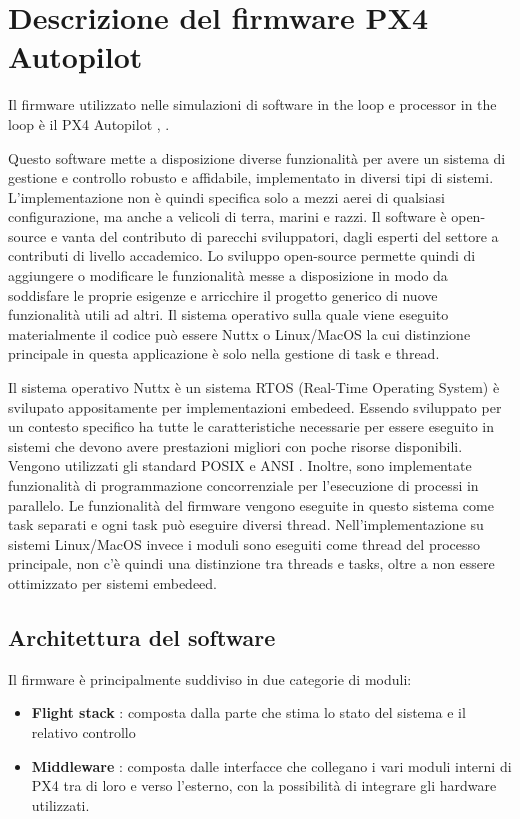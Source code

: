 \section{Descrizione del firmware PX4 Autopilot}
Il firmware utilizzato nelle simulazioni di software in the loop e processor in the loop è il PX4 Autopilot \cite{px4Firmware}, \cite{px4Guide}.
	
Questo software mette a disposizione diverse funzionalità per avere un sistema di gestione e controllo robusto e affidabile, implementato in diversi tipi di sistemi. L'implementazione non è quindi specifica solo a mezzi aerei di qualsiasi configurazione, ma anche a velicoli di terra, marini e razzi. Il software è open-source e vanta del contributo di parecchi sviluppatori, dagli esperti del settore a contributi di livello accademico. Lo sviluppo open-source permette quindi di aggiungere o modificare le funzionalità messe a disposizione in modo da soddisfare le proprie esigenze e arricchire il progetto generico di nuove funzionalità utili ad altri. Il sistema operativo sulla quale viene eseguito materialmente il codice può essere Nuttx o Linux/MacOS la cui distinzione principale in questa applicazione è solo nella gestione di task e thread.

Il sistema operativo Nuttx è un sistema RTOS (Real-Time Operating System) è svilupato appositamente per implementazioni embedeed. Essendo sviluppato per un contesto specifico ha tutte le caratteristiche necessarie per essere eseguito in sistemi che devono avere prestazioni migliori con poche risorse disponibili. Vengono utilizzati gli standard POSIX e ANSI \cite{Nuttx}. Inoltre, sono implementate funzionalità di programmazione concorrenziale per l'esecuzione di processi in parallelo. Le funzionalità del firmware vengono eseguite in questo sistema come task separati e ogni task può eseguire diversi thread.
Nell'implementazione su sistemi Linux/MacOS invece i moduli sono eseguiti come thread del processo principale, non c'è quindi una distinzione tra threads e tasks, oltre a non essere ottimizzato per sistemi embedeed.


\subsection{Architettura del software}
Il firmware è principalmente suddiviso in due categorie di moduli:
\begin{itemize}
	\item \textbf{Flight stack} : composta dalla parte che stima lo stato del sistema e il relativo controllo
	\item \textbf{Middleware} : composta dalle interfacce che collegano i vari moduli interni di PX4 tra di loro e verso l'esterno, con la possibilità di integrare gli hardware utilizzati.
\end{itemize}

